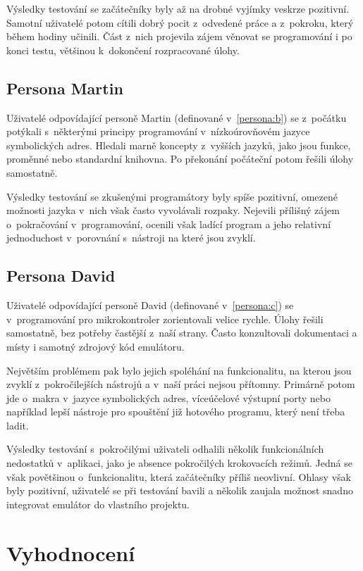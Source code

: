 Výsledky testování se začátečníky byly až na drobné vyjímky veskrze pozitivní. Samotní uživatelé potom cítili dobrý pocit z~odvedené práce a z~pokroku, který během hodiny učinili. Část z~nich projevila zájem věnovat se programování i po konci testu, většinou k~dokončení rozpracované úlohy.

\subsection{Persona Martin}

Uživatelé odpovídající personě Martin (definované v~\ref{persona:b}) se z~počátku potýkali s~některými principy programování v~nízkoúrovňovém jazyce symbolických adres. Hledali marně koncepty z~vyšších jazyků, jako jsou funkce, proměnné nebo standardní knihovna. Po překonání počáteční  potom řešili úlohy samostatně.

Výsledky testování se zkušenými programátory byly spíše pozitivní, omezené možnosti jazyka v~nich však často vyvolávali rozpaky. Nejevili přílišný zájem o~pokračování v~programování, ocenili však ladící program a jeho relativní jednoduchost v~porovnání s~nástroji na které jsou zvyklí.

\subsection{Persona David}

Uživatelé odpovídající personě David (definované v~\ref{persona:c}) se v~programování pro mikrokontroler zorientovali velice rychle. Úlohy řešili samostatně, bez potřeby častější z~naší strany. Často konzultovali dokumentaci a místy i samotný zdrojový kód emulátoru.

Největším problémem pak bylo jejich spoléhání na funkcionalitu, na kterou jsou zvyklí z~pokročilejších nástrojů a v~naší práci nejsou přítomny. Primárně potom jde o~makra v~jazyce symbolických adres, víceúčelové výstupní porty nebo například lepší nástroje pro spouštění již hotového programu, který není třeba ladit.

Výsledky testování s~pokročilými uživateli odhalili několik funkcionálních nedostatků v~aplikaci, jako je absence pokročilých krokovacích režimů. Jedná se však povětšinou o~funkcionalitu, která začátečníky příliš neovlivní. Ohlasy však byly pozitivní, uživatelé se při testování bavili a několik zaujala možnost snadno integrovat emulátor do vlastního projektu.

\section{Vyhodnocení}


